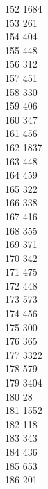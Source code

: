 { 152	1684 \\
 153	261 \\
 154	404 \\
 155	448 \\
 156	312 \\
 157	451 \\
 158	330 \\
 159	406 \\
 160	347 \\
 161	456 \\
 162	1837 \\
 163	448 \\
 164	459 \\
 165	322 \\
 166	338 \\
 167	416 \\
 168	355 \\
 169	371 \\
 170	342 \\
 171	475 \\
 172	448 \\
 173	573 \\
 174	456 \\
 175	300 \\
 176	365 \\
 177	3322 \\
 178	579 \\
 179	3404 \\
 180	28 \\
 181	1552 \\
 182	118 \\
 183	343 \\
 184	436 \\
 185	653 \\
 186	201 \\
}
